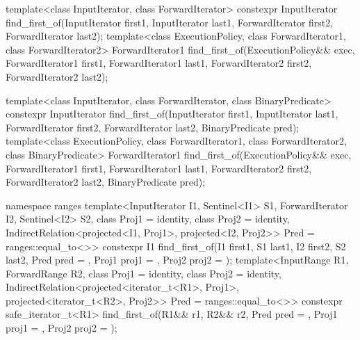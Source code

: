 %
\begin{itemdecl}
template<class InputIterator, class ForwardIterator>
  constexpr InputIterator
    find_first_of(InputIterator first1, InputIterator last1,
                  ForwardIterator first2, ForwardIterator last2);
template<class ExecutionPolicy, class ForwardIterator1, class ForwardIterator2>
  ForwardIterator1
    find_first_of(ExecutionPolicy&& exec,
                  ForwardIterator1 first1, ForwardIterator1 last1,
                  ForwardIterator2 first2, ForwardIterator2 last2);

template<class InputIterator, class ForwardIterator,
         class BinaryPredicate>
  constexpr InputIterator
    find_first_of(InputIterator first1, InputIterator last1,
                  ForwardIterator first2, ForwardIterator last2,
                  BinaryPredicate pred);
template<class ExecutionPolicy, class ForwardIterator1, class ForwardIterator2,
         class BinaryPredicate>
  ForwardIterator1
    find_first_of(ExecutionPolicy&& exec,
                  ForwardIterator1 first1, ForwardIterator1 last1,
                  ForwardIterator2 first2, ForwardIterator2 last2,
                  BinaryPredicate pred);

namespace ranges {
  template<InputIterator I1, Sentinel<I1> S1, ForwardIterator I2, Sentinel<I2> S2,
           class Proj1 = identity, class Proj2 = identity,
           IndirectRelation<projected<I1, Proj1>,
                            projected<I2, Proj2>> Pred = ranges::equal_to<>>
    constexpr I1 find_first_of(I1 first1, S1 last1, I2 first2, S2 last2,
                                Pred pred = {},
                                Proj1 proj1 = {}, Proj2 proj2 = {});
  template<InputRange R1, ForwardRange R2, class Proj1 = identity,
           class Proj2 = identity,
           IndirectRelation<projected<iterator_t<R1>, Proj1>,
                            projected<iterator_t<R2>, Proj2>> Pred = ranges::equal_to<>>
    constexpr safe_iterator_t<R1>
      find_first_of(R1&& r1, R2&& r2,
                    Pred pred = {},
                    Proj1 proj1 = {}, Proj2 proj2 = {});
}
\end{itemdecl}

